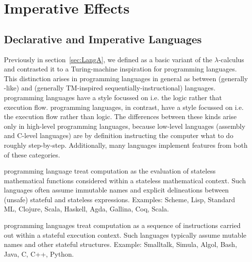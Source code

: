 \chapter{Imperative Effects}
\label{ch:simple-effects}

\section{Declarative and Imperative Languages}
\label{sec:declarative-and-imperative-languages}

Previously in section~\ref{sec:LangA}, we defined \LangA as a basic variant of the $λ$-calculus and contrasted it to a Turing-machine inspiration for programming languages.
This distinction arises in programming languages in general as between  (generally \lc-like) and  (generally TM-inspired sequentially-instructional) languages.
 programming languages have a style focussed on  i.e. the logic rather that execution flow.
 programming languages, in contrast, have a style focussed on  i.e. the execution flow rather than logic.
The differences between these kinds arise only in high-level programming languages, because low-level languages (assembly and C-level languages) are by definition instructing the computer what to do roughly step-by-step.
Additionally, many languages implement features from both of these categories.

\begin{blockdefinition}
   programming language treat computation as the evaluation of stateless mathematical functions considered within a stateless mathematical context.
  Such languages often assume immutable names and explicit delineations between (unsafe) stateful and stateless expressions.
  Examples: Scheme, Lisp, Standard ML, Clojure, Scala, Haskell, Agda, Gallina, Coq, Scala.
\end{blockdefinition}

\begin{blockdefinition}
   programming languages treat computation as a sequence of instructions carried out within a stateful execution context.
  Such languages typically assume mutable names and other stateful structures.
  Example: Smalltalk, Simula, Algol, Bash, Java, C, C++, Python.
\end{blockdefinition}


